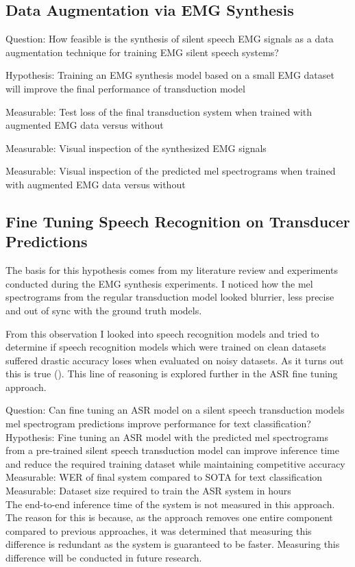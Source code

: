 \subsection{Data Augmentation via EMG Synthesis}

Question: How feasible is the synthesis of silent speech EMG signals
as a data augmentation technique for training EMG silent speech systems?

Hypothesis: Training an EMG synthesis model based on a small
EMG dataset will improve the final performance of transduction model

Measurable: Test loss of the final transduction system when trained
with augmented EMG data versus without

Measurable: Visual inspection of the synthesized EMG signals

Measurable: Visual inspection of the predicted mel spectrograms when
trained with augmented EMG data versus without

\subsection{Fine Tuning Speech Recognition on Transducer Predictions }

The basis for this hypothesis comes from my literature review and
experiments conducted during the EMG synthesis experiments. I noticed
how the mel spectrograms from the regular transduction model looked
blurrier, less precise and out of sync with the ground truth models.

From this observation I looked into speech recognition models and
tried to determine if speech recognition models which were trained
on clean datasets suffered drastic accuracy loses when evaluated
on noisy datasets. As it turns out this is true (\cite{DS2_original}).
This line of reasoning is explored further in the ASR fine tuning approach.

Question: Can fine tuning an ASR model on a silent speech
transduction models mel spectrogram predictions improve performance for
text classification? \\

Hypothesis: Fine tuning an ASR model with the predicted
mel spectrograms from a pre-trained silent speech transduction model
can improve inference time and reduce the required training dataset
while maintaining competitive accuracy \\

Measurable: WER of final system compared to SOTA for text classification \\
Measurable: Dataset size required to train the ASR system in hours \\

The end-to-end inference time of the system is not measured in this
approach. The reason for this is because, as the approach removes one
entire component compared to previous approaches, it was determined that
measuring this difference is redundant as the system is guaranteed
to be faster. Measuring this difference will be conducted in future
research.